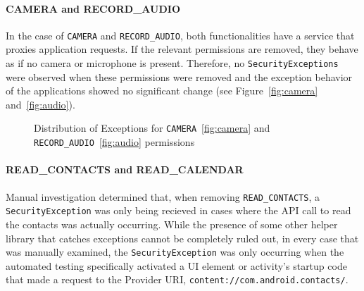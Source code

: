 \paragraph{{\bfseries \ttfamily CAMERA} and {\bfseries \ttfamily RECORD\_AUDIO}}
In the case of \texttt{CAMERA} and \texttt{RECORD\_AUDIO}, both functionalities have a service that proxies application requests.  If the relevant permissions are removed, they behave as if no camera or microphone is present.  Therefore, no \texttt{SecurityExceptions} were observed when these permissions were removed and the exception behavior of the applications showed no significant change (see Figure~\ref{fig:camera} and~\ref{fig:audio}).
\begin{figure}[h!]
\hfill
{}
\hfill
{}
\hfill
\caption{Distribution of Exceptions for \texttt{CAMERA}~\ref{fig:camera} and \texttt{RECORD\_AUDIO}~\ref{fig:audio} permissions}
\end{figure}

\paragraph{{\bfseries \ttfamily READ\_CONTACTS} and {\bfseries \ttfamily READ\_CALENDAR}}
Manual investigation determined that, when removing \texttt{READ\_CONTACTS}, a \texttt{SecurityException} was only being recieved in cases where the API call to read the contacts was actually occurring. While the presence of some other helper library that catches exceptions cannot be completely ruled out, in every case that was manually examined, the \texttt{SecurityException} was only occurring when the automated testing specifically activated a UI element or activity's startup code that made a request to the Provider URI, \texttt{content://com.android.contacts/}. 

